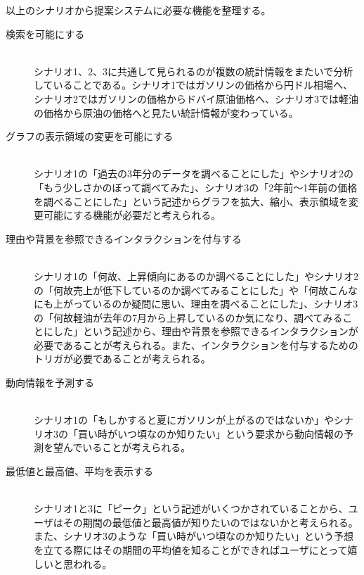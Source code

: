 \documentclass{matsushita-zemi}
\begin{document}
以上のシナリオから提案システムに必要な機能を整理する。
\begin{description}
 \item[検索を可能にする]\mbox{}\\ 
 シナリオ1、2、3に共通して見られるのが複数の統計情報をまたいで分析していることである。シナリオ1ではガソリンの価格から円ドル相場へ、シナリオ2ではガソリンの価格からドバイ原油価格へ、シナリオ3では軽油の価格から原油の価格へと見たい統計情報が変わっている。
 \item[グラフの表示領域の変更を可能にする]\mbox{}\\
 シナリオ1の「過去の3年分のデータを調べることにした」やシナリオ2の「もう少しさかのぼって調べてみた」、シナリオ3の「2年前〜1年前の価格を調べることにした」という記述からグラフを拡大、縮小、表示領域を変更可能にする機能が必要だと考えられる。
 \item[理由や背景を参照できるインタラクションを付与する]\mbox{}\\
 シナリオ1の「何故、上昇傾向にあるのか調べることにした」やシナリオ2の「何故売上が低下しているのか調べてみることにした」や「何故こんなにも上がっているのか疑問に思い、理由を調べることにした」、シナリオ3の「何故軽油が去年の7月から上昇しているのか気になり、調べてみることにした」という記述から、理由や背景を参照できるインタラクションが必要であることが考えられる。また、インタラクションを付与するためのトリガが必要であることが考えられる。
 \item[動向情報を予測する]\mbox{}\\
 シナリオ1の「もしかすると夏にガソリンが上がるのではないか」やシナリオ3の「買い時がいつ頃なのか知りたい」という要求から動向情報の予測を望んでいることが考えられる。
 \item[最低値と最高値、平均を表示する]\mbox{}\\
 シナリオ1と3に「ピーク」という記述がいくつかされていることから、ユーザはその期間の最低値と最高値が知りたいのではないかと考えられる。また、シナリオ3のような「買い時がいつ頃なのか知りたい」という予想を立てる際にはその期間の平均値を知ることができればユーザにとって嬉しいと思われる。
\end{description}

\end{document}
